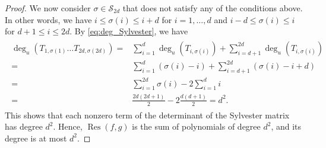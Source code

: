 \documentclass[10pt,a4paper]{amsart}
\DeclareMathOperator{\res}{{Res}}
\begin{document}
\begin{proof}
	We now consider $\sigma\in\mathcal{S}_{2d}$ that does not satisfy any of the conditions above. In other words, we have $i\leq \sigma(i) \leq i+d$ for $i=1,\dots ,d$ and $i-d\leq \sigma(i) \leq i$ for $d+1\leq i \leq 2d$. By \eqref{eq:deg_Sylvester}, we have 
{\allowdisplaybreaks	\begin{align*}
		\begin{split}
			\deg_u(T_{1,\sigma(1)}\dots T_{2d,\sigma(2d)})= & \sum_{i=1}^{d}\deg_u(T_{i,\sigma(i)}) + \sum_{i=d+1}^{2d}\deg_u(T_{i,\sigma(i)})\\
			=& \sum_{i=1}^d (\sigma(i)-i) + \sum_{i=d+1}^{2d} (\sigma(i)-i+d) \\
			=& \sum_{i=1}^{2d} \sigma(i) -2 \sum_{i=1}^d i  \\
			=& \frac{2d(2d+1)}{2} - 2\frac{d(d+1)}{2}=d^2.
		\end{split}
	\end{align*}
}
	This shows that each nonzero term of the determinant of the Sylvester matrix has degree $d^2$. Hence, $\res(f,g)$ is the sum of polynomials of degree $d^2$, and its degree is at most $d^2$. 
\end{proof}
\end{document}
